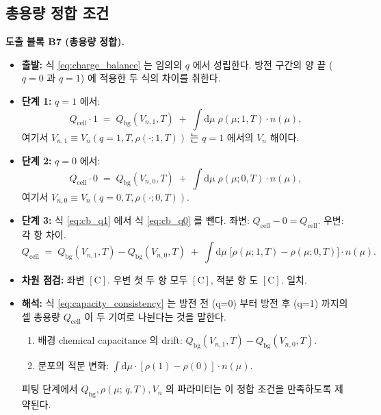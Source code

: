 \documentclass[11pt,a4paper]{article}
\newcommand{\dd}{\mathrm{d}}
\newcommand{\bg}{\mathrm{bg}}
\newcommand{\cell}{\mathrm{cell}}
\newcommand{\Cunit}{\mathrm{C}}
\newcommand{\mucont}{\mu}
\newcommand{\rhomu}{\rho(\mucont;\, q, T)}
\newcommand{\nmu}{n(\mucont)}
\begin{document}
\subsection{총용량 정합 조건}
\label{sec:capacity_consistency}

\textbf{도출 블록 B7 (총용량 정합).}

\begin{itemize}
\item \textbf{출발:} 식 \eqref{eq:charge_balance} 는 임의의 $q$ 에서 성립한다.
      방전 구간의 양 끝 ($q = 0$ 과 $q = 1$) 에 적용한 두 식의 차이를 취한다.
\item \textbf{단계 1:} $q = 1$ 에서:
      \begin{equation}
      Q_{\cell} \cdot 1
      \;=\;
      Q_{\bg}(V_{n,1}, T)
      \;+\;
      \int \dd\mucont\;\rho(\mucont; 1, T) \cdot \nmu,
      \label{eq:cb_q1}
      \end{equation}
      여기서 $V_{n,1} \equiv V_n(q = 1, T, \rho(\cdot; 1, T))$ 는 $q = 1$ 에서의
      $V_n$ 해이다.
\item \textbf{단계 2:} $q = 0$ 에서:
      \begin{equation}
      Q_{\cell} \cdot 0
      \;=\;
      Q_{\bg}(V_{n,0}, T)
      \;+\;
      \int \dd\mucont\;\rho(\mucont; 0, T) \cdot \nmu,
      \label{eq:cb_q0}
      \end{equation}
      여기서 $V_{n,0} \equiv V_n(q = 0, T, \rho(\cdot; 0, T))$.
\item \textbf{단계 3:} 식 \eqref{eq:cb_q1} 에서 식 \eqref{eq:cb_q0} 를 뺀다.
      좌변: $Q_{\cell} - 0 = Q_{\cell}$. 우변: 각 항 차이.
      \begin{equation}
      \boxed{
      Q_{\cell}
      \;=\;
      Q_{\bg}(V_{n,1}, T) - Q_{\bg}(V_{n,0}, T)
      \;+\;
      \int \dd\mucont\;\bigl[\rho(\mucont; 1, T) - \rho(\mucont; 0, T)\bigr] \cdot \nmu .
      }
      \label{eq:capacity_consistency}
      \end{equation}
\item \textbf{차원 점검:} 좌변 $[\Cunit]$. 우변 첫 두 항 모두 $[\Cunit]$, 적분 항
      도 $[\Cunit]$. 일치.
\item \textbf{해석:} 식 \eqref{eq:capacity_consistency} 는 방전 전 (q=0) 부터
      방전 후 (q=1) 까지의 셀 총용량 $Q_{\cell}$ 이 두 기여로 나뉜다는 것을
      말한다.
      \begin{enumerate}[label=(\alph*)]
      \item 배경 chemical capacitance 의 drift: $Q_{\bg}(V_{n,1}, T) - Q_{\bg}(V_{n,0}, T)$.
      \item 분포의 적분 변화: $\int \dd\mucont \cdot [\rho(1) - \rho(0)] \cdot \nmu$.
      \end{enumerate}
      피팅 단계에서 $Q_{\bg}, \rhomu, V_n$ 의 파라미터는 이 정합 조건을
      만족하도록 제약된다.
\end{itemize}
\end{document}
